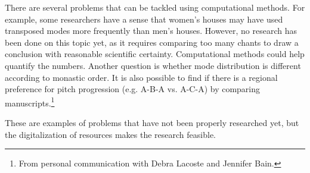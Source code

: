 There are several problems that can be tackled using computational methods. For example, some researchers have a sense that women's houses may have used
transposed modes more frequently than men's houses. However, no research has been done on this topic yet, as it requires comparing too many chants to draw
a conclusion with reasonable scientific certainty. Computational methods could help quantify the numbers.
Another question is whether mode distribution is different according to monastic order. It is also possible to find if there is a regional preference for
pitch progression (e.g. A-B-A vs. A-C-A) by comparing manuscripts.\footnote{From personal communication with Debra Lacoste and Jennifer Bain.}

These are examples of problems that have not been properly researched yet, but the digitalization of resources makes the research feasible.
